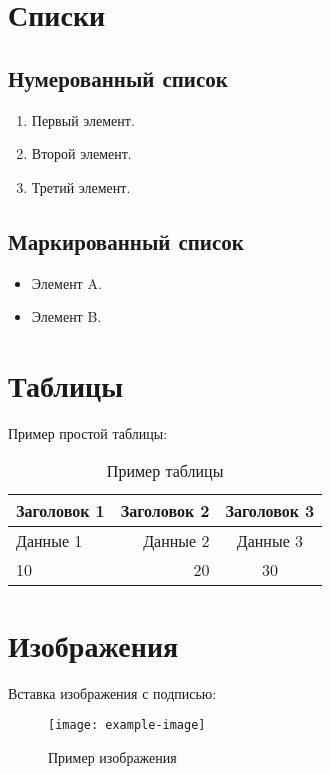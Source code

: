 \documentclass[a4paper, 12pt]{extarticle}
\begin{document}
\section{Списки}

\subsection{Нумерованный список}
\begin{enumerate}
    \item Первый элемент.
    \item Второй элемент.
    \item Третий элемент.
\end{enumerate}

\subsection{Маркированный список}
\begin{itemize}
    \item Элемент A.
    \item Элемент B.
\end{itemize}

\section{Таблицы}

Пример простой таблицы:

\begin{table}[h!]
    \begin{tabular}{l|r|c}
        \hline
        \textbf{Заголовок 1} & \textbf{Заголовок 2} & \textbf{Заголовок 3} \\ \hline
        Данные 1             & Данные 2             & Данные 3             \\ \hline
        10                   & 20                   & 30                   \\ \hline
    \end{tabular}
    \caption{Пример таблицы}
    \label{tab:example}
\end{table}

\section{Изображения}

Вставка изображения с подписью:
\begin{figure}[h!]
    \centering
    \texttt{[image: example-image]} %
    \caption{Пример изображения}
    \label{fig:example}
\end{figure}
\end{document}
